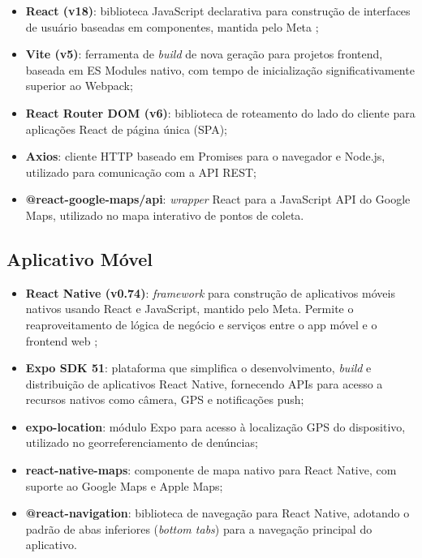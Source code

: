 \documentclass[12pt, a4paper]{article}
\numberwithin{equation}{section}
\numberwithin{figure}{section}
\numberwithin{table}{section}
\begin{document}
\begin{itemize}
  \item \textbf{React (v18)}: biblioteca JavaScript declarativa para
        construção de interfaces de usuário baseadas em componentes,
        mantida pelo Meta \cite{facebook2013};
  \item \textbf{Vite (v5)}: ferramenta de \textit{build} de nova geração
        para projetos frontend, baseada em ES Modules nativo, com tempo
        de inicialização significativamente superior ao Webpack;
  \item \textbf{React Router DOM (v6)}: biblioteca de roteamento do lado
        do cliente para aplicações React de página única (SPA);
  \item \textbf{Axios}: cliente HTTP baseado em Promises para o navegador
        e Node.js, utilizado para comunicação com a API REST;
  \item \textbf{@react-google-maps/api}: \textit{wrapper} React para
        a JavaScript API do Google Maps, utilizado no mapa interativo de
        pontos de coleta.
\end{itemize}

\subsection{Aplicativo Móvel}

\begin{itemize}
  \item \textbf{React Native (v0.74)}: \textit{framework} para construção
        de aplicativos móveis nativos usando React e JavaScript, mantido
        pelo Meta. Permite o reaproveitamento de lógica de negócio e
        serviços entre o app móvel e o frontend web \cite{eisenman2015};
  \item \textbf{Expo SDK 51}: plataforma que simplifica o desenvolvimento,
        \textit{build} e distribuição de aplicativos React Native,
        fornecendo APIs para acesso a recursos nativos como câmera,
        GPS e notificações push;
  \item \textbf{expo-location}: módulo Expo para acesso à localização GPS
        do dispositivo, utilizado no georreferenciamento de denúncias;
  \item \textbf{react-native-maps}: componente de mapa nativo para React
        Native, com suporte ao Google Maps e Apple Maps;
  \item \textbf{@react-navigation}: biblioteca de navegação para React
        Native, adotando o padrão de abas inferiores (\textit{bottom tabs})
        para a navegação principal do aplicativo.
\end{itemize}
\end{document}
